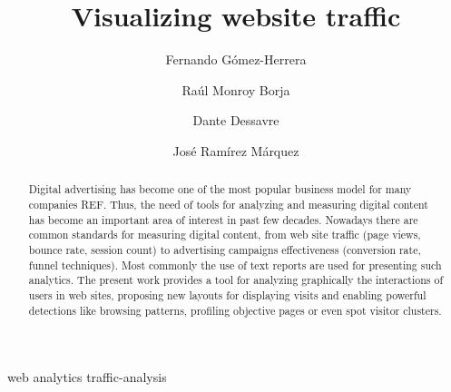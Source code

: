 \documentclass[preprint,12pt,3p]{elsarticle}
\begin{document}
\begin{frontmatter}

\title{Visualizing website traffic}

\author[label1]{Fernando G\'{o}mez-Herrera}
\address[label1]{Instituto Tecnol\'{o}gico y de Estudios Superiores de Monterrey (ITESM)}
\author[label1]{Ra\'{u}l Monroy Borja}

\author[label2]{Dante Dessavre}
\author[label2]{Jos\'{e} Ram\'{i}rez M\'{a}rquez}
\address[label2]{Stevens Institute of Technology (Stevens)}



\begin{abstract}
Digital advertising has become one of the most popular business model for many companies REF. Thus, the need of tools for analyzing and measuring digital content has become an important area of interest in past few decades. Nowadays there are common standards for measuring digital content, from web site traffic (page views, bounce rate, session count) to advertising campaigns effectiveness (conversion rate, funnel techniques). Most commonly the use of text reports are used for presenting such analytics. The present work provides a tool for analyzing graphically the interactions of users in web sites, proposing new layouts for displaying visits and enabling powerful detections like browsing patterns, profiling objective pages or even spot visitor clusters.
\end{abstract}

\begin{keyword}
web analytics traffic-analysis
\end{keyword}

\end{frontmatter}


\end{document}
